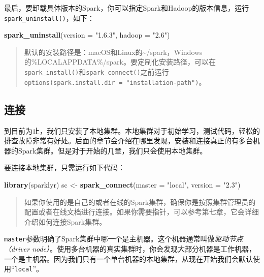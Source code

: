 \documentclass[
]{article}
\newenvironment{Shaded}{\begin{snugshade}}{\end{snugshade}}
\newcommand{\DataTypeTok}[1]{\textcolor[rgb]{0.13,0.29,0.53}{#1}}
\newcommand{\KeywordTok}[1]{\textcolor[rgb]{0.13,0.29,0.53}{\textbf{#1}}}
\newcommand{\NormalTok}[1]{#1}
\newcommand{\StringTok}[1]{\textcolor[rgb]{0.31,0.60,0.02}{#1}}
\begin{document}
最后，要卸载具体版本的Spark，你可以指定Spark和Hadoop的版本信息，运行\texttt{spark\_uninstall()}，如下：

\begin{Shaded}
\begin{Highlighting}[]
\KeywordTok{spark_uninstall}\NormalTok{(}\DataTypeTok{version =} \StringTok{"1.6.3"}\NormalTok{, }\DataTypeTok{hadoop =} \StringTok{"2.6"}\NormalTok{)}
\end{Highlighting}
\end{Shaded}

\begin{quote}
默认的安装路径是：macOS和Linux的\textasciitilde/spark，Windows的\%LOCALAPPDATA\%/spark。要定制化安装路径，可以在\texttt{spark\_install()}和\texttt{spark\_connect()}之前运行\texttt{options(spark.install.dir\ =\ "installation-path")}。
\end{quote}

\hypertarget{ux8fdeux63a5}{%
\subsection{连接}\label{ux8fdeux63a5}}

到目前为止，我们只安装了本地集群。本地集群对于初始学习，测试代码，轻松的排查故障非常有好处。后面的章节会介绍在哪里发现，安装和连接真正的有多台机器的Spark集群。但是对于开始的几章，我们只会使用本地集群。

要连接本地集群，只需运行如下代码：

\begin{Shaded}
\begin{Highlighting}[]
\KeywordTok{library}\NormalTok{(sparklyr)}
\NormalTok{sc <-}\StringTok{ }\KeywordTok{spark_connect}\NormalTok{(}\DataTypeTok{master =} \StringTok{"local"}\NormalTok{, }\DataTypeTok{version =} \StringTok{"2.3"}\NormalTok{)}
\end{Highlighting}
\end{Shaded}

\begin{quote}
如果你使用的是自己的或者在线的Spark集群，确保你是按照集群管理员的配置或者在线文档进行连接。如果你需要指针，可以参考第七章，它会详细介绍如何连接Spark集群。
\end{quote}

\texttt{master}参数明确了Spark集群中哪一个是主机器。这个机器通常叫做\emph{驱动节点（driver
node）}。使用多台机器的真实集群时，你会发现大部分机器是工作机器，一个是主机器。因为我们只有一个单台机器的本地集群，从现在开始我们会默认使用``\texttt{local}''。
\end{document}
